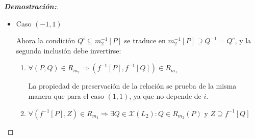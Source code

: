 \documentclass[12pt]{book}
\newcommand{\Fg}{\mathnormal{F_g}}
\newcommand{\BDL}{\mathsf{BDL}}
\newcommand{\PS}{\mathsf{PS}}
\begin{document}
\begin{proof}[{\textbf{Demostración:}}]
\begin{itemize}
\begin{enumerate}
Consideremos ahora $P \in \mathcal{X}(\mathbb{L}_{2})$, $Z \in \mathcal{X}(\mathbb{L}_{1})$ tales que $(f^{-1}[P], Z) \in R_{m_1}$
se sigue entonces que $Z \subseteq m_1^{-1}[f^{-1}[P]]$. De esto último, tenemos que  $f(Z) \subseteq m_2^{-1}[P]$. Consideremos ahora el filtro generado por $f[Z]$,  $F = \Fg^{\mathbb{L}_{2}}\left( f[Z] \right)$. Vamos a comprobar que 
\[  F \cap m_2^{-1}[P]^c = \emptyset \]
En efecto, si $a \in F \cap m_{2}^{-1}[P]^{c}$ entonces existe $z \in Z$ tal que $f(z) \leq a$ y $m_{2}(a) \notin P$. Dado que $m_{2}$ es de tipo $(1,1)$, $m_{2}(f(z)) \leq m_{2}(a)$ y por lo tanto, $m_{2}(f(z)) \notin P$. Dado que $f$ es flecha en $\BDL(i,j)$, se sigue que $z \notin m_{1}^{-1}[f^{-1}[P]]$, lo que resulta en una contradicción, ya que $z \in Z \subseteq m_{1}^{-1}[f^{-1}[P]]$. Luego, por el teorema del filtro primo, existe $Q \in \mathcal{X}(L_2)$ tal que $F \subseteq Q$ y $Q \subseteq m_2^{-1}[P]$, lo que implica que 
\[  Z \subseteq f^{-1}[Q] \hspace{0.2cm} \text{ y } \hspace{0.2cm} Q \in R_{m_2}(P) \]
\end{enumerate}
Por lo que $\mathfrak{X}(f)$ es una flecha de $\PS(1,1)$.

\item Caso $(-1,1)$

Ahora la condición $Q^i\subseteq m_2^{-1}[P]$ se traduce en $m_2^{-1}[P]\supseteq Q^{-1}=Q^c$, y la segunda inclusión debe invertirse:
\begin{enumerate}
    \item $\forall(P,Q) \in R_{m_2}\Rightarrow (f^{-1}[P], f^{-1}[Q]) \in R_{m_1}$
    
\vspace{0.2cm}
    
    La propiedad de preservación de la relación se prueba de la misma manera que para el caso $(1,1)$, ya que no depende de $i$. 
    
\vspace{0.2cm}
    
    \item $\forall(f^{-1}[P], Z) \in R_{m_1}\Rightarrow\exists Q \in \mathcal{X}(L_2): Q \in R_{m_2}(P)$ y $Z \supseteq f^{-1}[Q]$
    
\vspace{0.2cm}


\end{enumerate}
\end{itemize}
\end{proof}
\end{document}

